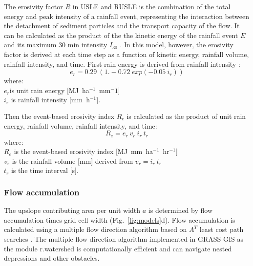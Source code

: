 \documentclass[gmd, manuscript]{copernicus}
\begin{document}
The erosivity factor $R$ 
in USLE and RUSLE 
is the combination of the total energy 
and peak intensity of a rainfall event,
representing the interaction 
between the detachment of sediment particles
and the transport capacity of the flow. 
It can be calculated as the product of the 
the kinetic energy of the rainfall event $E$
and its maximum 30 \unit{min} intensity $I_{30}$
\citep{Brown1987,Renard1997}.
In this model, however, the erosivity factor
is derived at each time step as a function of
kinetic energy, rainfall volume, rainfall intensity, and time.
First rain energy is derived from rainfall intensity \citep{Brown1987}:
%
\begin{equation}
\label{eq:rain_energy}
{e_r = 0.29 ~ (1.-0.72 ~ exp(-0.05 ~ i_r))}
\end{equation}
%
{\small
\noindent
where: \\
\noindent
\hspace*{0.5em} $e_r$is unit rain energy [\unit{MJ~ha}$^{-1}$~\unit{mm}${^-1}$]\\
\hspace*{0.5em} $i_r$ is rainfall intensity [\unit{mm~h}$^{-1}$].\\
}

\noindent
Then the event-based erosivity index $R_e$ 
is calculated as the product of 
unit rain energy, rainfall volume, rainfall intensity, and time: 
\begin{equation}
\label{eq:erosivity_index}
{R_e = e_r ~ v_r ~ i_r ~ t_r}
\end{equation}
%
{\small
\noindent
where: \\
\hspace*{0.5em} $R_e$ is the event-based erosivity index [\unit{MJ~mm~ha}$^{-1}$~\unit{hr}$^{-1}$]\\
\hspace*{0.5em} $v_r$ is the rainfall volume [\unit{mm}] derived from ${v_r = i_r~t_r}$\\
\hspace*{0.5em} $t_r$ is the time interval [\unit{s}].
}


\subsubsection{Flow accumulation}
%
The upslope contributing area per unit width $a$
is determined by flow accumulation times grid cell width
(Fig.~\ref{fig:models}d). 
Flow accumulation is calculated using 
a multiple flow direction algorithm \citep{Metz2009} 
based on $A^{T}$ least cost path searches \citep{Ehlschlaeger1989}. 
The multiple flow direction algorithm 
implemented in GRASS GIS as the module r.watershed
is computationally efficient and can
navigate nested depressions and other obstacles. 
\end{document}
